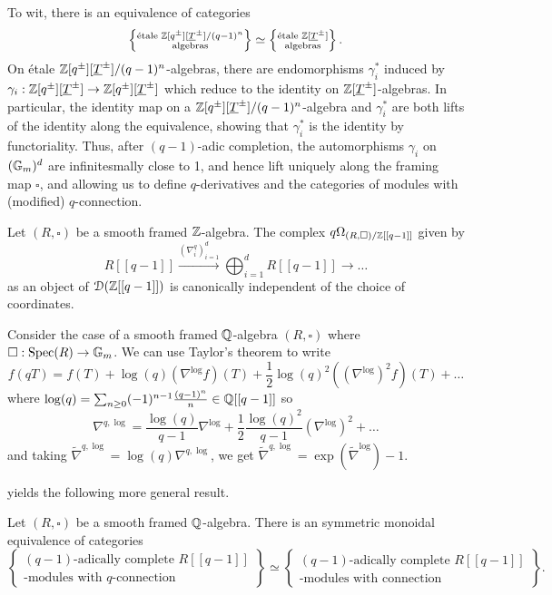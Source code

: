 To wit, there is an equivalence of categories 
$$\left\{\substack{\text{\'{e}tale }\mathbb{Z}[q^{\pm}][\underline{T}^{\pm}]/(q-1)^{n} \\ \text{algebras}}\right\}\simeq\left\{\substack{\text{\'{e}tale }\mathbb{Z}[\underline{T}^{\pm}] \\ \text{algebras}}\right\}.$$
On \'{e}tale $\mathbb{Z}[q^{\pm}][\underline{T}^{\pm}]/(q-1)^{n}$-algebras, there are endomorphisms $\gamma_{i}^{*}$ induced by $\gamma_{i}:\mathbb{Z}[q^{\pm}][\underline{T}^{\pm}]\to\mathbb{Z}[q^{\pm}][\underline{T}^{\pm}]$ which reduce to the identity on $\mathbb{Z}[\underline{T}^{\pm}]$-algebras. In particular, the identity map on a $\mathbb{Z}[q^{\pm}][\underline{T}^{\pm}]/(q-1)^{n}$-algebra and $\gamma_{i}^{*}$ are both lifts of the identity along the equivalence, showing that $\gamma_{i}^{*}$ is the identity by functoriality. Thus, after $(q-1)$-adic completion, the automorphisms $\gamma_{i}$ on $(\mathbb{G}_{m})^{d}$ are infinitesmally close to 1, and hence lift uniquely along the framing map $\square$, and allowing us to define $q$-derivatives and the categories of modules with (modified) $q$-connection. 
\begin{theorem}
    Let $(R,\square)$ be a smooth framed $\mathbb{Z}$-algebra. The complex $q\Omega_{(R,\square)/\mathbb{Z}[[q-1]]}$ given by 
    $$R[[q-1]]\xrightarrow{(\nabla_{i}^{q})_{i=1}^{d}}\bigoplus_{i=1}^{d}R[[q-1]]\longrightarrow\dots$$
    as an object of $\EuScript{D}(\mathbb{Z}[[q-1]])$ is canonically independent of the choice of coordinates. 
\end{theorem}
\begin{example}\label{ex: translation between connections and q-connections}
    Consider the case of a smooth framed $\mathbb{Q}$-algebra $(R,\square)$ where $\square:\operatorname{Spec}(R)\to\mathbb{G}_{m}$. We can use Taylor's theorem to write 
    $$f(qT)=f(T)+\log(q)(\nabla^{\log}f)(T)+\frac{1}{2}\log(q)^{2}((\nabla^{\log})^{2}f)(T)+\dots$$
    where $\log(q)=\sum_{n\geq0}(-1)^{n-1}\frac{(q-1)^{n}}{n}\in\mathbb{Q}[[q-1]]$ so 
    $$\nabla^{q,\log}=\frac{\log(q)}{q-1}\nabla^{\log}+\frac{1}{2}\frac{\log(q)^{2}}{q-1}(\nabla^{\log})^{2}+\dots$$
    and taking $\widetilde{\nabla}^{q,\log}=\log(q)\nabla^{q,\log}$, we get $\widetilde{\nabla}^{q,\log}=\exp(\widetilde{\nabla}^{\log})-1$. 
\end{example}
 yields the following more general result. 
\begin{proposition}\label{prop: R-modules with ordinary connection}
    Let $(R,\square)$ be a smooth framed $\mathbb{Q}$-algebra. There is an symmetric monoidal equivalence of categories 
    $$\left\{\substack{(q-1)\text{-adically complete }R[[q-1]] \\ \text{-modules with }q\text{-connection}}\right\}\simeq\left\{\substack{(q-1)\text{-adically complete }R[[q-1]] \\ \text{-modules with connection}}\right\}.$$
\end{proposition}
